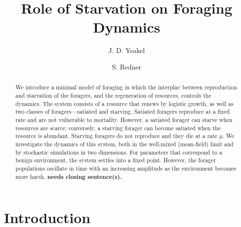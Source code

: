 \documentclass[11pt]{article}
\begin{document}
\title{Role of Starvation on Foraging Dynamics}


\author{J. D. Yeakel} \address{Santa Fe Institute, 1399 Hyde Park Road, Santa Fe, New
  Mexico 87501, USA}

\author{S. Redner} \address{Santa Fe Institute, 1399 Hyde Park Road, Santa Fe, New
  Mexico 87501, USA}

\begin{abstract}

  We introduce a minimal model of foraging in which the interplay between
  reproduction and starvation of the foragers, and the regeneration of
  resources, controls the dynamics.  The system consists of a resource that
  renews by logistic growth, as well as two classes of foragers---satiated
  and starving.  Satiated foragers reproduce at a fixed rate and are not
  vulnerable to mortality.  However, a satiated forager can starve when
  resources are scarce; conversely, a starving forager can become satiated
  when the resource is abundant.  Starving foragers do not reproduce and they
  die at a rate $\mu$.  We investigate the dynamics of this system, both in
  the well-mixed (mean-field) limit and by stochastic simulations in two
  dimensions.  For parameters that correspond to a benign environment, the
  system settles into a fixed point.  However, the forager populations
  oscillate in time with an increasing amplitude as the environment becomes
  more harsh.  {\bf needs closing sentence(s).}

\end{abstract}

\section{Introduction}
\end{document}
